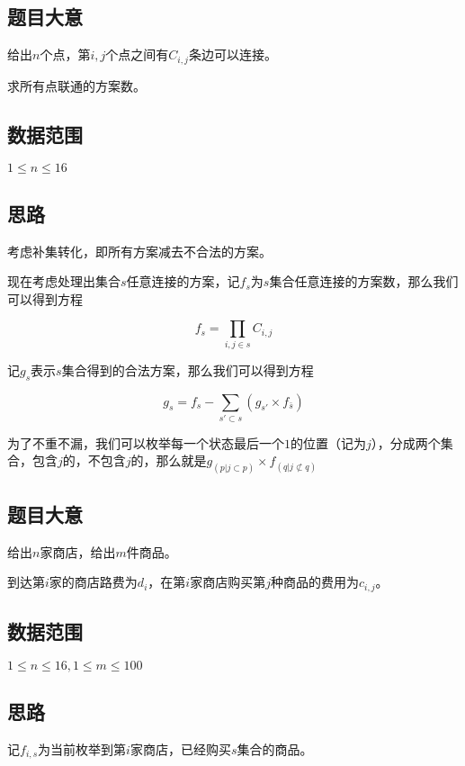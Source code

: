 \documentclass{ctexart}
\numberwithin{equation}{section}
\begin{document}
\begin{flushleft}
  \subsection{题目大意}
  给出$n$个点，第$i,j$个点之间有$C_{i,j}$条边可以连接。

  求所有点联通的方案数。
  
  
  \subsection{数据范围}
  $1\le n \le 16$
  \subsection{思路}
  考虑补集转化，即所有方案减去不合法的方案。

  现在考虑处理出集合$s$任意连接的方案，记$f_{s}$为$s$集合任意连接的方案数，那么我们可以得到方程

  $$f_{s}=\prod_{i,j\in s} C_{i,j}$$

  记$g_s$表示$s$集合得到的合法方案，那么我们可以得到方程

  $$g_s=f_s-\sum_{s'\subset s}(g_{s'}\times f_{\bar s})$$

  为了不重不漏，我们可以枚举每一个状态最后一个$1$的位置（记为$j$），分成两个集合，包含$j$的，不包含$j$的，那么就是$g_{(p|j \subset p)}\times f_{(q|j \not\subset q)}$
  \newpage

  \subsection{题目大意}
  给出$n$家商店，给出$m$件商品。

  到达第$i$家的商店路费为$d_i$，在第$i$家商店购买第$j$种商品的费用为$c_{i,j}$。
  
  
  \subsection{数据范围}
  $1\le n \le 16,1\le m\le 100$
  \subsection{思路}
  记$f_{i,s}$为当前枚举到第$i$家商店，已经购买$s$集合的商品。
  

\end{flushleft}
\end{document}
